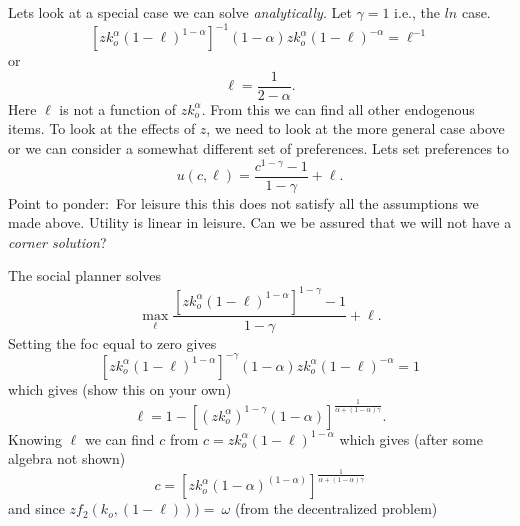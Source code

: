 \documentclass{sebase}
\begin{document}
Lets look at a special case we can solve \textit{analytically}. Let $\gamma
=1$ i.e., the $ln$ case.%
\begin{equation*}
\left[ zk_{o}^{\alpha }\left( 1-\ell \right) ^{1-\alpha }\right] ^{-1}\left(
1-\alpha \right) zk_{o}^{\alpha }\left( 1-\ell \right) ^{-\alpha }=\ell ^{-1}
\end{equation*}%
or 
\begin{equation*}
\ell =\frac{1}{2-\alpha }.
\end{equation*}%
Here $\ell $ is not a function of $zk_{o}^{\alpha }.$ From this we can find
all other endogenous items. To look at the effects of $z$, we need to look
at the more general case above or we can consider a somewhat different set
of preferences. Lets set preferences to 
\begin{equation*}
u\left( c,\ell \right) =\frac{c^{1-\gamma }-1}{1-\gamma }+\ell .
\end{equation*}%
Point to ponder:\ For leisure this this does not satisfy all the assumptions
we made above. Utility is linear in leisure. Can we be assured that we will
not have a \textit{corner solution}?\pagebreak

The social planner solves%
\begin{equation*}
\underset{\ell }{\max }\frac{\left[ zk_{o}^{\alpha }\left( 1-\ell \right)
^{1-\alpha }\right] ^{1-\gamma }-1}{1-\gamma }+\ell .
\end{equation*}%
Setting the foc equal to zero gives%
\begin{equation*}
\left[ zk_{o}^{\alpha }\left( 1-\ell \right) ^{1-\alpha }\right] ^{-\gamma
}\left( 1-\alpha \right) zk_{o}^{\alpha }\left( 1-\ell \right) ^{-\alpha }=1
\end{equation*}%
which gives (show this on your own)%
\begin{equation*}
\ell =1-\left[ \left( zk_{o}^{\alpha }\right) ^{1-\gamma }\left( 1-\alpha
\right) \right] ^{\frac{1}{\alpha +\left( 1-\alpha \right) \gamma }}.
\end{equation*}%
\pagebreak Knowing $\ell $ we can find $c$ from $c=zk_{o}^{\alpha }\left(
1-\ell \right) ^{1-\alpha }$ which gives (after some algebra not shown)%
\begin{equation*}
c=\left[ zk_{o}^{\alpha }\left( 1-\alpha \right) ^{\left( 1-\alpha \right) }%
\right] ^{\frac{1}{\alpha +\left( 1-\alpha \right) \gamma }}
\end{equation*}%
and since $zf_{2}\left( k_{o},\left( 1-\ell \right) \right) )=\ \omega $
(from the decentralized problem) $\allowbreak $
\end{document}
